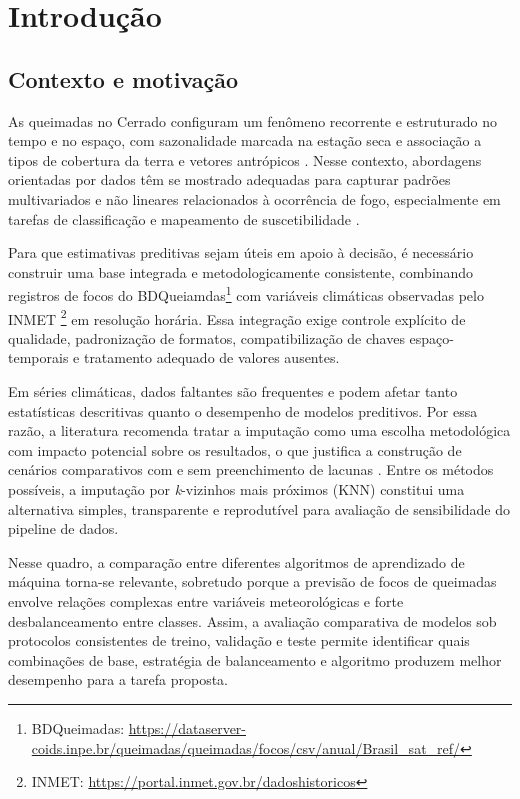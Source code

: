 \chapter{Introdução}

\section{Contexto e motivação}

As queimadas no Cerrado configuram um fenômeno recorrente e estruturado no tempo e no espaço, com sazonalidade marcada na estação seca e associação a tipos de cobertura da terra e vetores antrópicos \cite{nascimento2011analise}. Nesse contexto, abordagens orientadas por dados têm se mostrado adequadas para capturar padrões multivariados e não lineares relacionados à ocorrência de fogo, especialmente em tarefas de classificação e mapeamento de suscetibilidade \cite{andrianarivony2024review,freitas2025xingu}.

Para que estimativas preditivas sejam úteis em apoio à decisão, é necessário construir uma base integrada e metodologicamente consistente, combinando registros de focos do BDQueiamdas\footnote{BDQueimadas: \url{https://dataserver-coids.inpe.br/queimadas/queimadas/focos/csv/anual/Brasil_sat_ref/}} com variáveis climáticas observadas pelo INMET \footnote{INMET: \url{https://portal.inmet.gov.br/dadoshistoricos}} em resolução horária. Essa integração exige controle explícito de qualidade, padronização de formatos, compatibilização de chaves espaço-temporais e tratamento adequado de valores ausentes.

Em séries climáticas, dados faltantes são frequentes e podem afetar tanto estatísticas descritivas quanto o desempenho de modelos preditivos. Por essa razão, a literatura recomenda tratar a imputação como uma escolha metodológica com impacto potencial sobre os resultados, o que justifica a construção de cenários comparativos com e sem preenchimento de lacunas \cite{alejosanchez2025review,afridayamoah2020imputation,ribeiro2021imputation}. Entre os métodos possíveis, a imputação por \textit{k}-vizinhos mais próximos (KNN) constitui uma alternativa simples, transparente e reprodutível para avaliação de sensibilidade do pipeline de dados.

Nesse quadro, a comparação entre diferentes algoritmos de aprendizado de máquina torna-se relevante, sobretudo porque a previsão de focos de queimadas envolve relações complexas entre variáveis meteorológicas e forte desbalanceamento entre classes. Assim, a avaliação comparativa de modelos sob protocolos consistentes de treino, validação e teste permite identificar quais combinações de base, estratégia de balanceamento e algoritmo produzem melhor desempenho para a tarefa proposta.

